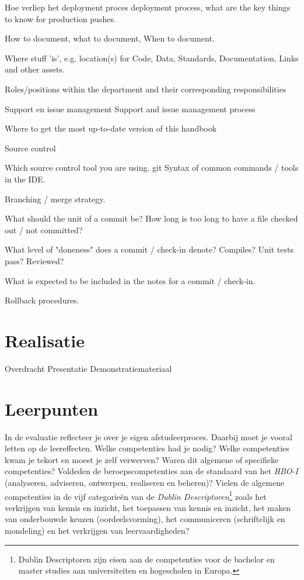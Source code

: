 		Hoe verliep het deployment proces
		deployment process, what are the key things to know for production pushes.
		
		How to document, what to document, When to document.
		
		Where stuff 'is', e.g. location(s) for Code, Data, Standards, Documentation, Links and other assets.
		
		
		
		Roles/positions within the department and their corresponding responsibilities
		
		Support en issue management
		Support and issue management process
		
		Where to get the most up-to-date version of this handbook
		
		Source control
		
		Which source control tool you are using.
		git
		Syntax of common commands / tools in the IDE.
		
		Branching / merge strategy.
		
		What should the unit of a commit be? How long is too long to have a file checked out / not committed?
		
		What level of "doneness" does a commit / check-in denote? Compiles? Unit tests pass? Reviewed?
		
		What is expected to be included in the notes for a commit / check-in.
		
		Rollback procedures.
		
		
		\section{Realisatie}
		Overdracht
		Presentatie
		Demonstratiemateriaal
		
		\section{Leerpunten}
		In de evaluatie reflecteer je over je eigen afstudeerproces. Daarbij
		moet je vooral letten op de leereffecten. Welke competenties had je
		nodig? Welke competenties kwam je tekort en moest je zelf verwerven?
		Waren dit algemene of specifieke competenties?  Voldeden de
		beroepscompetenties aan de standaard van het \emph{HBO-I} (analyseren,
		adviseren, ontwerpen, realiseren en beheren)?  Vielen de algemene
		competenties in de vijf categorieën van de \emph{Dublin
			Descriptoren}\footnote{Dublin Descriptoren zijn eisen aan de
			competenties voor de bachelor en master studies aan universiteiten en
			hogescholen in Europa.} zoals het verkrijgen van kennis en inzicht,
		het toepassen van kennis en inzicht, het maken van onderbouwde keuzen
		(oordeelsvorming), het communiceren (schriftelijk en mondeling) en het
		verkrijgen van leervaardigheden?	
		
